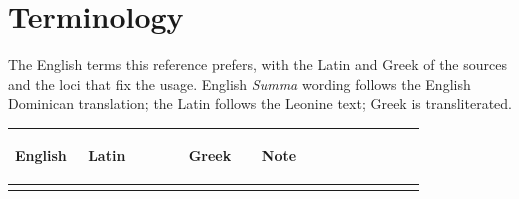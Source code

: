 \section{Terminology}\label{app:terminology}

The English terms this reference prefers, with the Latin and Greek
of the sources and the loci that fix the usage. English \emph{Summa}
wording follows the English Dominican translation; the Latin follows
the Leonine text; Greek is transliterated.

\begingroup\footnotesize
\begin{longtable}{>{\bfseries\raggedright\arraybackslash}p{0.16\linewidth}>{\raggedright\arraybackslash}p{0.22\linewidth}>{\raggedright\arraybackslash}p{0.16\linewidth}>{\raggedright\arraybackslash}p{0.36\linewidth}}
\toprule
\textbf{English} & \textbf{Latin} & \textbf{Greek} & \textbf{Note}\\
\midrule
\endhead
\bottomrule
\endfoot


\end{longtable}

